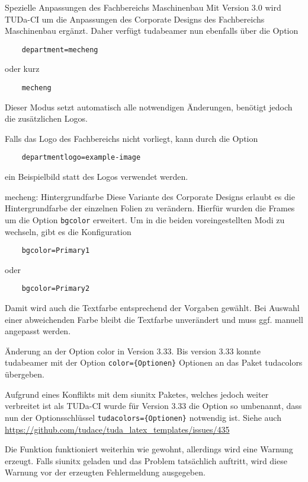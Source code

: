 \documentclass[
	german,%
	aspectratio=169,%
	accentcolor=2d,%
	logo=false,%
	colorframetitle=true,%
	design=2008,  %
]{tudabeamer}
\let\code\texttt
\begin{document}
\begin{frame}[fragile]{Spezielle Anpassungen des Fachbereichs Maschinenbau}
	Mit Version 3.0 wird TUDa-CI um die Anpassungen des Corporate Designs des Fachbereichs Maschinenbau ergänzt.
	Daher verfügt tudabeamer nun ebenfalls über die Option
\begin{verbatim}
	department=mecheng
\end{verbatim}
	oder kurz
\begin{verbatim}
	mecheng
\end{verbatim}
	Dieser Modus setzt automatisch alle notwendigen Änderungen, benötigt jedoch die zusätzlichen Logos.

	Falls das Logo des Fachbereichs nicht vorliegt, kann durch die Option
\begin{verbatim}
	departmentlogo=example-image
\end{verbatim} ein Beispielbild statt des Logos verwendet werden.
\end{frame}

\begin{frame}[fragile]{mecheng: Hintergrundfarbe}
	Diese Variante des Corporate Designs erlaubt es die Hintergrundfarbe der einzelnen Folien zu verändern. Hierfür wurden die Frames um die Option \code{bgcolor} erweitert. Um in die beiden voreingestellten Modi zu wechseln, gibt es die Konfiguration
\begin{verbatim}
	bgcolor=Primary1
\end{verbatim}
	oder
\begin{verbatim}
	bgcolor=Primary2
\end{verbatim}
	Damit wird auch die Textfarbe entsprechend der Vorgaben gewählt. Bei Auswahl einer abweichenden Farbe bleibt die Textfarbe unverändert und muss ggf. manuell angepasst werden.
\end{frame}

\begin{frame}[fragile]{Änderung an der Option color in Version 3.33.}
	Bis version 3.33 konnte tudabeamer mit der Option \verb+color={Optionen}+ Optionen an das Paket tudacolors übergeben.

	Aufgrund eines Konflikts mit dem siunitx Paketes, welches jedoch weiter verbreitet ist als TUDa-CI wurde für Version 3.33 die Option so umbenannt, dass nun der Optionsschlüssel \verb+tudacolors={Optionen}+ notwendig ist.
	Siehe auch \url{https://github.com/tudace/tuda_latex_templates/issues/435}

	Die Funktion funktioniert weiterhin wie gewohnt, allerdings wird eine Warnung erzeugt. Falls siunitx geladen und das Problem tatsächlich auftritt, wird diese Warnung vor der erzeugten Fehlermeldung ausgegeben.
\end{frame}
\end{document}
